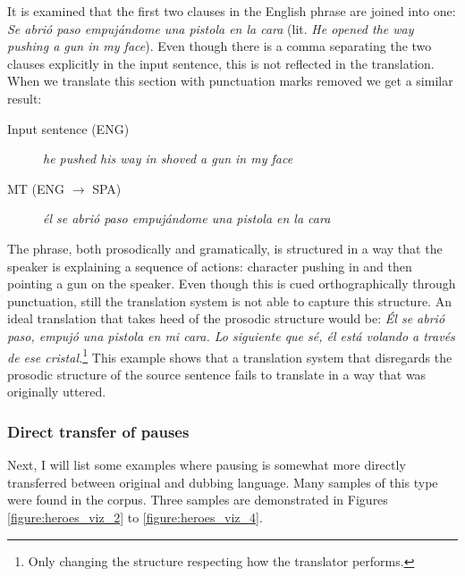It is examined that the first two clauses in the English phrase are joined into one: \textit{Se abrió paso empujándome una pistola en la cara} (lit. \textit{He opened the way pushing a gun in my face}). Even though there is a comma separating the two clauses explicitly in the input sentence, this is not reflected in the translation. When we translate this section with punctuation marks removed we get a similar result:

\begin{description}
\item [Input sentence (ENG)] {\it he pushed his way in shoved a gun in my face} 
\item [MT (ENG $\rightarrow$ SPA)] {\it él se abrió paso empujándome una pistola en la cara}
\end{description}

The phrase, both prosodically and gramatically, is structured in a way that the speaker is explaining a sequence of actions: character pushing in and then pointing a gun on the speaker. Even though this is cued orthographically through punctuation, still the translation system is not able to capture this structure. An ideal translation that takes heed of the prosodic structure would be:
\textit{Él se abrió paso, empujó una pistola en mi cara. Lo siguiente que sé, él está volando a través de ese cristal.}\footnote{Only changing the structure respecting how the translator performs.} This example shows that a translation system that disregards the prosodic structure of the source sentence fails to translate in a way that was originally uttered. 

\subsubsection{Direct transfer of pauses}
Next, I will list some examples where pausing is somewhat more directly transferred between original and dubbing language. Many samples of this type were found in the corpus. Three samples are demonstrated in Figures \ref{figure:heroes_viz_2} to \ref{figure:heroes_viz_4}. 

